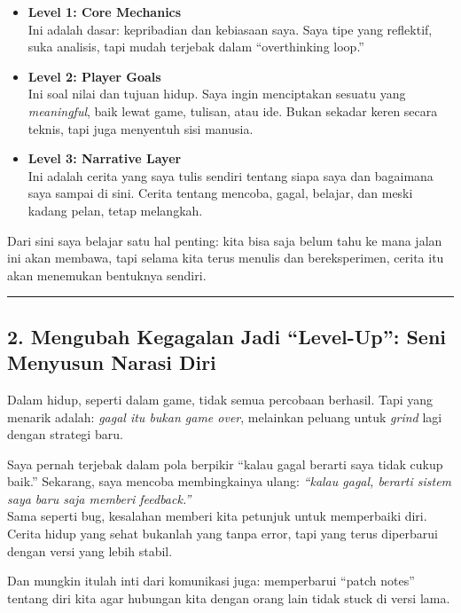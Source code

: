 \documentclass[
  letterpaper,
  DIV=11,
  numbers=noendperiod]{scrreprt}
\begin{document}
\begin{itemize}
\item
  \textbf{Level 1: Core Mechanics}\\
  Ini adalah dasar: kepribadian dan kebiasaan saya. Saya tipe yang
  reflektif, suka analisis, tapi mudah terjebak dalam ``overthinking
  loop.''
\item
  \textbf{Level 2: Player Goals}\\
  Ini soal nilai dan tujuan hidup. Saya ingin menciptakan sesuatu yang
  \emph{meaningful}, baik lewat game, tulisan, atau ide. Bukan sekadar
  keren secara teknis, tapi juga menyentuh sisi manusia.
\item
  \textbf{Level 3: Narrative Layer}\\
  Ini adalah cerita yang saya tulis sendiri tentang siapa saya dan
  bagaimana saya sampai di sini. Cerita tentang mencoba, gagal, belajar,
  dan meski kadang pelan, tetap melangkah.
\end{itemize}

Dari sini saya belajar satu hal penting: kita bisa saja belum tahu ke
mana jalan ini akan membawa, tapi selama kita terus menulis dan
bereksperimen, cerita itu akan menemukan bentuknya sendiri.

\begin{center}\rule{0.5\linewidth}{0.5pt}\end{center}

\subsection{\texorpdfstring{\textbf{2. Mengubah Kegagalan Jadi
``Level-Up'': Seni Menyusun Narasi
Diri}}{2. Mengubah Kegagalan Jadi ``Level-Up'': Seni Menyusun Narasi Diri}}\label{mengubah-kegagalan-jadi-level-up-seni-menyusun-narasi-diri}

Dalam hidup, seperti dalam game, tidak semua percobaan berhasil. Tapi
yang menarik adalah: \emph{gagal itu bukan game over}, melainkan peluang
untuk \emph{grind} lagi dengan strategi baru.

Saya pernah terjebak dalam pola berpikir ``kalau gagal berarti saya
tidak cukup baik.'' Sekarang, saya mencoba membingkainya ulang:
\emph{``kalau gagal, berarti sistem saya baru saja memberi
feedback.''}\\
Sama seperti bug, kesalahan memberi kita petunjuk untuk memperbaiki
diri. Cerita hidup yang sehat bukanlah yang tanpa error, tapi yang terus
diperbarui dengan versi yang lebih stabil.

Dan mungkin itulah inti dari komunikasi juga: memperbarui ``patch
notes'' tentang diri kita agar hubungan kita dengan orang lain tidak
stuck di versi lama.
\end{document}
